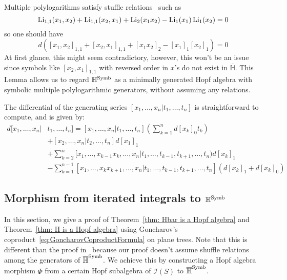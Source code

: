 \begin{remark}
Multiple polylogarithms satisfy stuffle relations~\cite{Zhao_MultipleZetaFunctionsMultiplePolylogarithmsAndTheirSpecialValues} such as
\begin{equation}\label{eq: shuffle relation for Li_{1,1}}
\Li_{1,1}(x_1,x_2)+\Li_{1,1}(x_2,x_1)+\Li_2(x_1x_2)-\Li_1(x_1)\Li_1(x_2)=0
\end{equation}
so one should have
\[
d([x_1,x_2]_{1,1}+[x_2,x_1]_{1,1}+[x_1x_2]_{2}-[x_1]_1[x_2]_1)=0
\]
At first glance, this might seem contradictory, however, this won't be an issue since symbols like $[x_2,x_1]_{1,1}$ with reversed order in $x$'s do not exist in $\overline{\mathbb H}$. This Lemma allows us to regard $\mathbb H^{\operatorname{Symb}}$ as a minimally generated Hopf algebra with symbolic multiple polylogarithmic generators, without assuming any relations.
\end{remark}

The differential of the generating series $[x_1,\dots,x_n|t_1,\dots,t_n]$ is straightforward to compute, and is given by:
\begin{equation}\label{eq: differential of the generating series}
\begin{aligned}
d[x_1,\dots,x_n|&t_1,\dots,t_n]=[x_1,\dots,x_n|t_1,\dots,t_n]\left(\sum_{k=1}^nd [x_k]_0t_k\right)\\
&+[x_2,\dots,x_n|t_2,\dots,t_n]d[x_1]_1\\&+\sum_{k=2}^n[x_1,\dots,x_{k-1}x_k,\dots,x_n|t_1,\dots,t_{k-1},t_{k+1},\dots,t_n)d[x_k]_1\\
&-\sum_{k=1}^{n-1}[x_1,\dots,x_kx_{k+1},\dots,x_n|t_1,\dots,t_{k-1},t_{k+1},\dots,t_n]\left(d[x_k]_1+d[x_k]_0\right)
\end{aligned} 
\end{equation}


\subsection{Morphism from iterated integrals to $\mathbb H^{\operatorname{Symb}}$}

In this section, we give a proof of Theorem~\ref{thm: Hbar is a Hopf algebra} and Theorem~\ref{thm: H is a Hopf algebra} using Goncharov's coproduct~\ref{eq:GoncharovCoproductFormula} on plane trees. Note that this is different than the proof in~\cite{Goncharov_GaloisSymmetriesOfFundamentalGroupoidsAndNoncommutativeGeometry} because our proof doesn't assume shuffle relations among the generators of $\overline{\mathbb H}^{\operatorname{Symb}}$. We achieve this by constructing a Hopf algebra morphism $\Phi$ from a certain Hopf subalgebra of $\mathcal I(S)$ to $\overline{\mathbb H}^{\operatorname{Symb}}$.

